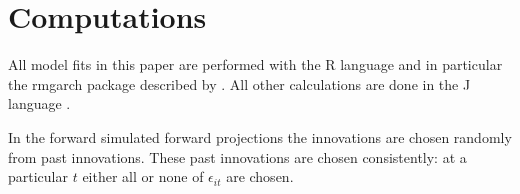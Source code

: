 \documentclass[12pt]{article}
\newcommand{\eps}{\epsilon}
\begin{document}
\section{Computations}

All model fits in this paper are performed with the R language \citep{R-Development-Core-Team:2008aa} and in particular the rmgarch package described by \cite{ghalanos2012rmgarch}.  All other calculations are done in the J language \citep{iverson2003j}.

In the forward simulated forward projections the  innovations are chosen randomly from past innovations.   These past innovations are chosen consistently:  at a particular $t$ either all or none of $\eps_{it}$ are chosen.





\end{document}
